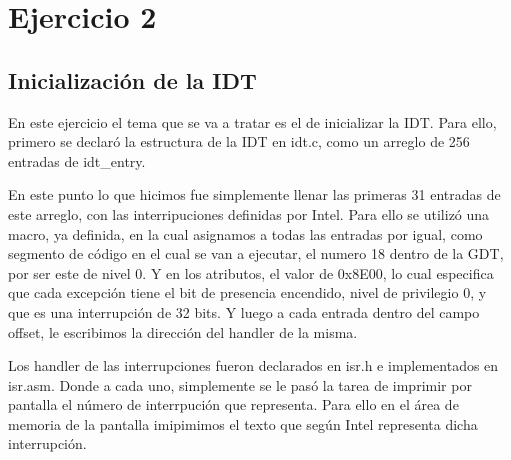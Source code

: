 \section{Ejercicio 2}
\subsection*{Inicialización de la IDT}
\par{En este ejercicio el tema que se va a tratar es el de inicializar la IDT. Para ello, primero se declaró la estructura de la IDT en idt.c, como un arreglo de 256 entradas de idt\_entry.}
\par{En este punto lo que hicimos fue simplemente llenar las primeras 31 entradas de este arreglo, con las interripuciones definidas por Intel. Para ello se utilizó una macro, ya definida, en la cual asignamos a todas las entradas por igual, como segmento de código en el cual se van a ejecutar, el numero 18 dentro de la GDT, por ser este de nivel 0. Y en los atributos, el valor de 0x8E00, lo cual especifica que cada excepción tiene el bit de presencia encendido, nivel de privilegio 0, y que es una interrupción de 32 bits. Y luego a cada entrada dentro del campo offset, le escribimos la dirección del handler de la misma.}
\par{Los handler de las interrupciones fueron declarados en isr.h e implementados en isr.asm. Donde a cada uno, simplemente se le pasó la tarea de imprimir por pantalla el número de interrpución que representa. Para ello en el área de memoria de la pantalla imipimimos el texto que según Intel representa dicha interrupción.}

\clearpage